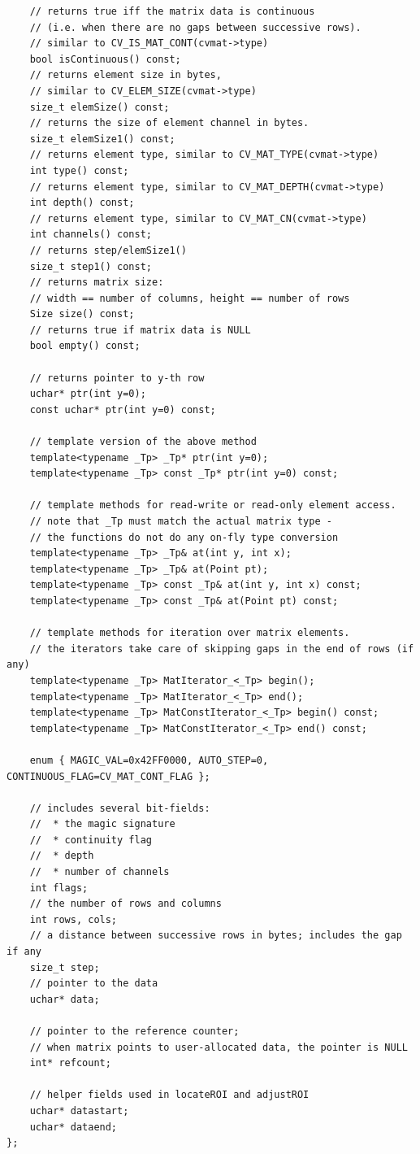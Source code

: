 \begin{lstlisting}
    // returns true iff the matrix data is continuous
    // (i.e. when there are no gaps between successive rows).
    // similar to CV_IS_MAT_CONT(cvmat->type)
    bool isContinuous() const;
    // returns element size in bytes,
    // similar to CV_ELEM_SIZE(cvmat->type)
    size_t elemSize() const;
    // returns the size of element channel in bytes.
    size_t elemSize1() const;
    // returns element type, similar to CV_MAT_TYPE(cvmat->type)
    int type() const;
    // returns element type, similar to CV_MAT_DEPTH(cvmat->type)
    int depth() const;
    // returns element type, similar to CV_MAT_CN(cvmat->type)
    int channels() const;
    // returns step/elemSize1()
    size_t step1() const;
    // returns matrix size:
    // width == number of columns, height == number of rows
    Size size() const;
    // returns true if matrix data is NULL
    bool empty() const;

    // returns pointer to y-th row
    uchar* ptr(int y=0);
    const uchar* ptr(int y=0) const;

    // template version of the above method
    template<typename _Tp> _Tp* ptr(int y=0);
    template<typename _Tp> const _Tp* ptr(int y=0) const;
    
    // template methods for read-write or read-only element access.
    // note that _Tp must match the actual matrix type -
    // the functions do not do any on-fly type conversion
    template<typename _Tp> _Tp& at(int y, int x);
    template<typename _Tp> _Tp& at(Point pt);
    template<typename _Tp> const _Tp& at(int y, int x) const;
    template<typename _Tp> const _Tp& at(Point pt) const;
    
    // template methods for iteration over matrix elements.
    // the iterators take care of skipping gaps in the end of rows (if any)
    template<typename _Tp> MatIterator_<_Tp> begin();
    template<typename _Tp> MatIterator_<_Tp> end();
    template<typename _Tp> MatConstIterator_<_Tp> begin() const;
    template<typename _Tp> MatConstIterator_<_Tp> end() const;

    enum { MAGIC_VAL=0x42FF0000, AUTO_STEP=0, CONTINUOUS_FLAG=CV_MAT_CONT_FLAG };

    // includes several bit-fields:
    //  * the magic signature
    //  * continuity flag
    //  * depth
    //  * number of channels
    int flags;
    // the number of rows and columns
    int rows, cols;
    // a distance between successive rows in bytes; includes the gap if any
    size_t step;
    // pointer to the data
    uchar* data;

    // pointer to the reference counter;
    // when matrix points to user-allocated data, the pointer is NULL
    int* refcount;
    
    // helper fields used in locateROI and adjustROI
    uchar* datastart;
    uchar* dataend;
};
\end{lstlisting}

